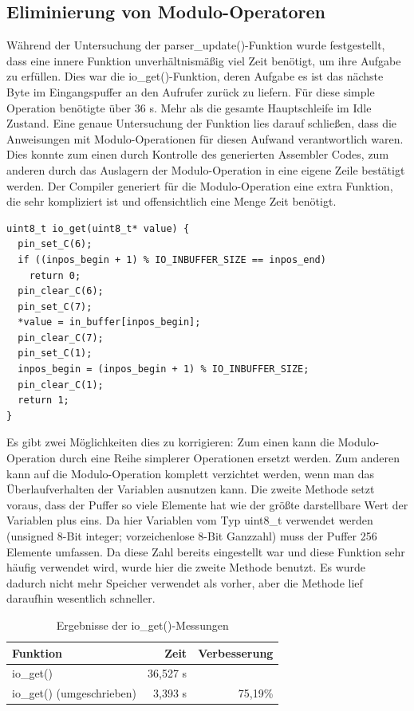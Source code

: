 \subsection{Eliminierung von Modulo-Operatoren}
Während der Untersuchung der parser\_\-update()-Funktion wurde festgestellt, dass eine innere Funktion unverhältnismäßig
viel Zeit benötigt, um ihre Aufgabe zu erfüllen. Dies war die io\_\-get()-Funktion, deren Aufgabe es ist das nächste Byte
im Eingangspuffer an den Aufrufer zurück zu liefern. Für diese simple Operation benötigte über 36 \textmu{}s. Mehr als die
gesamte Hauptschleife im Idle Zustand. Eine genaue Untersuchung der Funktion lies darauf schließen, dass die Anweisungen
mit Modulo-Operationen für diesen Aufwand verantwortlich waren. Dies konnte zum einen durch Kontrolle des generierten Assembler
Codes, zum anderen durch das Auslagern der Modulo-Operation in eine eigene Zeile bestätigt werden. Der Compiler generiert
für die Modulo-Operation eine extra Funktion, die sehr kompliziert ist und offensichtlich eine Menge Zeit benötigt.\\
\begin{verbatim}
uint8_t io_get(uint8_t* value) {
  pin_set_C(6);
  if ((inpos_begin + 1) % IO_INBUFFER_SIZE == inpos_end)
    return 0;
  pin_clear_C(6);
  pin_set_C(7);
  *value = in_buffer[inpos_begin];
  pin_clear_C(7);
  pin_set_C(1);
  inpos_begin = (inpos_begin + 1) % IO_INBUFFER_SIZE;
  pin_clear_C(1);
  return 1;
}
\end{verbatim}
Es gibt zwei Möglichkeiten dies zu korrigieren: Zum einen kann die Modulo-Operation durch eine Reihe simplerer Operationen ersetzt werden.
Zum anderen kann auf die Modulo-Operation komplett verzichtet werden, wenn man das Überlaufverhalten der Variablen ausnutzen kann.
Die zweite Methode setzt voraus, dass der Puffer so viele Elemente hat wie der größte darstellbare Wert der Variablen plus eins.
Da hier Variablen vom Typ uint8\_t verwendet werden (unsigned 8-Bit integer; vorzeichenlose 8-Bit Ganzzahl) muss der Puffer 256
Elemente umfassen. Da diese Zahl bereits eingestellt war und diese Funktion sehr häufig verwendet wird, wurde hier die zweite Methode
benutzt. Es wurde dadurch nicht mehr Speicher verwendet als vorher, aber die Methode lief daraufhin wesentlich schneller.
\begin{table}[htb]
\begin{center}
	\begin{tabular}{|l||r|r|}
		\hline
		\textbf{Funktion} & \textbf{Zeit} & \textbf{Verbesserung} \\ \hline \hline
		io\_get() & 36,527 \textmu{}s & \\ \hline
		io\_get() (umgeschrieben) & 3,393 \textmu{}s & 75,19\% \\ \hline
	\end{tabular}
	\caption{\label{io_get} Ergebnisse der io\_get()-Messungen}
\end{center}
\end{table}
